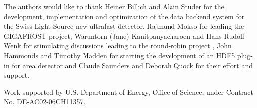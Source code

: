 \documentclass[pdf]{iucr}              %
\begin{document}




The authors would like to thank Heiner Billich and Alain Studer for the development, implementation and optimization of the data backend system for the Swiss Light Source new ultrafast detector, Rajmund Mokso for leading the GIGAFROST project, Waruntorn (Jane) Kanitpanyacharoen and Hans-Rudolf Wenk for stimulating discussions leading to the round-robin project \cite{Kanitpanyacharoen}, John Hammonds and Timothy Madden for starting the development of an HDF5 plug-in for area detector  and Claude Saunders and Deborah Quock for their effort and support.

Work supported by U.S. Department of Energy, Office of Science, under Contract No. DE-AC02-06CH11357. 




 
\end{document}
